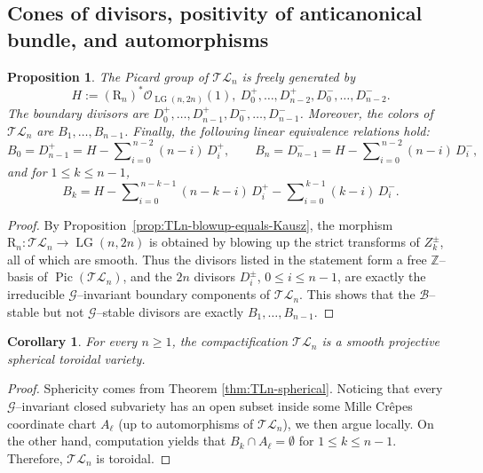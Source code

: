 \documentclass[10pt]{amsart}
\newtheorem{proposition}[theorem]{Proposition}
\newtheorem{corollary}[theorem]{Corollary}
\theoremstyle{definition}
\newcommand{\Z}{\mathbb{Z}}
\newcommand{\OO}{\mathcal{O}}
\newcommand{\Pic}{\operatorname{Pic}}
\newcommand{\LG}{\operatorname{LG}}
\newcommand{\TL}{\mathcal{TL}}
\newcommand{\RL}{\mathrm{R}}
\theoremstyle{plain} %
\begin{document}
\subsection{Cones of divisors, positivity of anticanonical bundle, and automorphisms} 
\begin{proposition}\label{prop:picard-effective}
The Picard group of $\TL_n$ is freely generated by
\[
H:=(\RL_n)^*\OO_{\LG(n,2n)}(1),\
D_0^+,\dots,D_{n-2}^+, D_0^-,\dots,D_{n-2}^-.
\]
The boundary divisors are
$D_0^+,\dots,D_{n-1}^+, D_0^-,\dots,D_{n-1}^-$.
Moreover, the colors of $\TL_n$ are $B_1,\dots,B_{n-1}$. Finally, the following linear equivalence relations hold:
\begin{equation}\label{eq:boundary-last}
B_0=D_{n-1}^+=H-\sum\nolimits_{i=0}^{\,n-2}(n-i)\,D_i^+,\qquad
B_n=D_{n-1}^-= H-\sum\nolimits_{i=0}^{\,n-2}(n-i)\,D_i^-,  
\end{equation}
and for $1\le k\le n-1$,
\begin{equation}\label{eq:boundary-mid}
B_k=H-\sum\nolimits_{i=0}^{\,n-k-1}\!(n-k-i)\,D_i^+
-\sum\nolimits_{i=0}^{\,k-1}\!(k-i)\,D_i^-.
\end{equation}
\end{proposition}
\begin{proof}
By Proposition~\ref{prop:TLn-blowup-equals-Kausz}, the morphism $\RL_n\colon\TL_n\longrightarrow\LG(n,2n)$ is obtained by blowing up the strict transforms of $Z_k^\pm$,  all of which are smooth. Thus the divisors listed in the statement form a free $\Z$–basis of $\Pic(\TL_n)$, and the $2n$ divisors $D_i^\pm$, $0\le i\le n-1$, are exactly the irreducible $\mathscr G$–invariant boundary components of $\TL_n$. This shows that the $\mathscr{B}$--stable but not $\mathscr G$–stable divisors are exactly $B_1,\dots,B_{n-1}$.
\end{proof}


\begin{corollary}\label{cor:toroidal-TLn}
For every $n\ge 1$, the compactification $\TL_n$ is a smooth projective spherical toroidal variety.
\end{corollary}

\begin{proof}
Sphericity comes from Theorem \ref{thm:TLn-spherical}. Noticing that every $\mathscr{G}$--invariant closed subvariety has an open subset inside some Mille Cr\^epes coordinate chart $A_{\ell}$ (up to automorphisms of $\TL_n$), we then argue locally. %
On the other hand, computation yields that $B_k\cap A_{\ell}=\emptyset$ for $1\leq k\leq n-1$. Therefore, $\TL_n$ is toroidal.
\end{proof}
\end{document}
